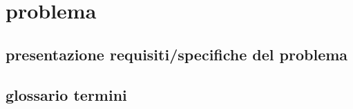 \section{problema}

\subsection{presentazione requisiti/specifiche del problema}

\subsection{glossario termini}